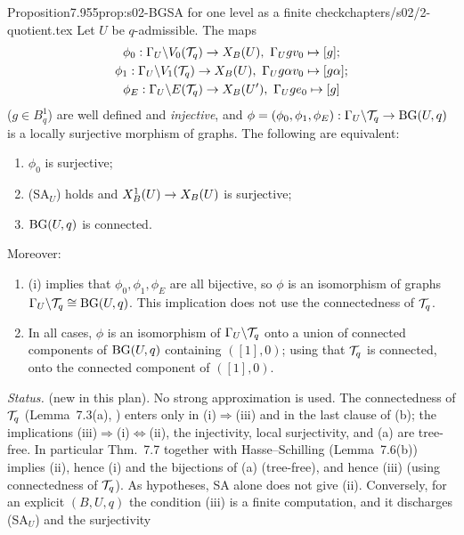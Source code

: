 \begin{quoted}{Proposition}{7.9}{55}{prop:s02-BG}{SA for one level as a finite check}{chapters/s02/2-quotient.tex}\label{rpt:prop:s02-BG}
Let $U$ be $q$-admissible. The maps
\begin{gather*}
\phi_0:\Gamma_U\backslash V_0(\mathcal{T}_q)\to X_B(U),\ \Gamma_U gv_0\mapsto[g];\\
\phi_1:\Gamma_U\backslash V_1(\mathcal{T}_q)\to X_B(U),\ \Gamma_U g\alpha v_0\mapsto[g\alpha];\\
\phi_E:\Gamma_U\backslash E(\mathcal{T}_q)\to X_B(U'),\ \Gamma_U ge_0\mapsto[g]
\end{gather*}
($g\in B^1_q$) are well defined and \emph{injective}, and $\phi=(\phi_0,\phi_1,\phi_E):\Gamma_U\backslash\mathcal{T}_q\to\mathrm{BG}(U,q)$ is a locally
surjective morphism of graphs. The following are equivalent:
\begin{enumerate}[label=(\roman*)]
\item $\phi_0$ is surjective;
\item (SA$_U$) holds and $X^1_B(U)\to X_B(U)$ is surjective;
\item $\mathrm{BG}(U,q)$ is connected.
\end{enumerate}
Moreover:
\begin{enumerate}[label=(\alph*)]
\item (i) implies that $\phi_0,\phi_1,\phi_E$ are all bijective, so $\phi$ is an isomorphism of graphs $\Gamma_U\backslash\mathcal{T}_q\cong\mathrm{BG}(U,q)$.
  This implication does not use the connectedness of $\mathcal{T}_q$.
\item In all cases, $\phi$ is an isomorphism of $\Gamma_U\backslash\mathcal{T}_q$ onto a union of connected components of $\mathrm{BG}(U,q)$ containing
  $([1],0)$; using that $\mathcal{T}_q$ is connected, onto the connected component of $([1],0)$.
\end{enumerate}
\par\smallskip{}\par
\noindent\emph{Status.} \stproved{} (new in this plan). No strong approximation is used. The connectedness of $\mathcal{T}_q$
(Lemma~7.3(a), \stcited) enters only in (i)$\Rightarrow$(iii) and in the last clause of (b); the implications
(iii)$\Rightarrow$(i)$\Leftrightarrow$(ii), the injectivity, local surjectivity, and (a) are tree-free.
In particular Thm.~7.7 together with Hasse--Schilling (Lemma~7.6(b)) implies (ii), hence (i) and the
bijections of (a) (tree-free), and hence (iii) (using connectedness of $\mathcal{T}_q$). As hypotheses, SA alone does not give (ii).
Conversely, for an explicit $(B,U,q)$ the condition (iii) is a finite computation, and it discharges (SA$_U$) and the surjectivity

\end{quoted}
